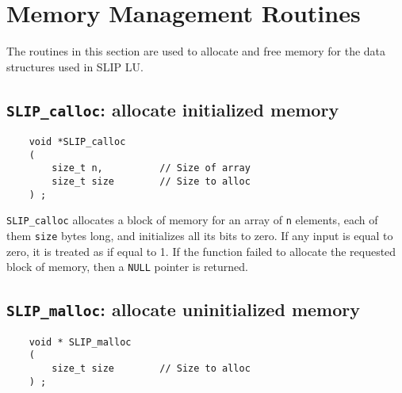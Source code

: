 \documentclass[12pt]{article}
\theoremstyle{definition}
\begin{document}
\section{Memory Management Routines} \label{s:user:memmanag}

The routines in this section are used to allocate and free memory for the data
structures used in SLIP LU.

\cprotect\subsection{\verb|SLIP_calloc|: allocate initialized memory}
\label{ss:SLIP_calloc}

\begin{mdframed}[userdefinedwidth=6in]
{\footnotesize
\begin{verbatim}
    void *SLIP_calloc
    (
        size_t n,          // Size of array
        size_t size        // Size to alloc
    ) ;
\end{verbatim}
} \end{mdframed}

\verb|SLIP_calloc| allocates a block of memory for an array of \verb|n|
elements, each of them \verb|size| bytes long, and initializes all its bits to
zero.  If any input is equal to zero, it is treated as if equal to 1.  If the
function failed to allocate the requested block of memory, then a \verb|NULL|
pointer is returned.

\cprotect\subsection{\verb|SLIP_malloc|: allocate uninitialized memory}
\label{ss:SLIP_malloc}

\begin{mdframed}[userdefinedwidth=6in]
{\footnotesize
\begin{verbatim}
    void * SLIP_malloc
    (
        size_t size        // Size to alloc
    ) ;
\end{verbatim}
} \end{mdframed}
\end{document}
